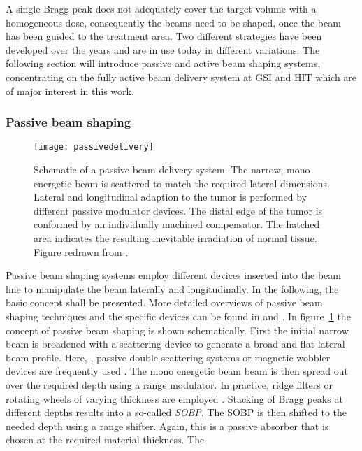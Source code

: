 A single Bragg peak does not adequately cover the target volume with a
homogeneous dose, consequently the beams need to be shaped, once the
beam has been guided to the treatment area. Two different strategies
have been developed over the years and are in use today in different
variations. The following section will introduce passive and active
beam shaping systems, concentrating on the fully active beam delivery
system at \ac{GSI} and \ac{HIT} which are of major interest in this
work.

\subsubsection{Passive beam shaping}
\label{sec:background:passivedelivery}
%
%
\begin{figure}[tbp]
  \centering
  \texttt{[image: passivedelivery]}
  \caption[Schematic of a passive beam delivery system.]{Schematic of
    a passive beam delivery system. The narrow, mono-energetic beam is
    scattered to match the required lateral dimensions. Lateral and
    longitudinal adaption to the tumor is performed by different
    passive modulator devices. The distal edge of the tumor is
    conformed by an individually machined compensator. The hatched
    area indicates the resulting inevitable irradiation of normal
    tissue. Figure redrawn from \citep{Schardt2010}.}
  \label{fig:background:passive}
\end{figure}
Passive beam shaping systems employ different devices inserted into
the beam line to manipulate the beam laterally and longitudinally. In
the following, the basic concept shall be presented. More detailed
overviews of passive beam shaping techniques and the specific devices
can be found in \citet{Chu1993, Kraft2000} and
\citet{Gottschalk2008}. In figure~\ref{fig:background:passive} the
concept of passive beam shaping is shown schematically. First the
initial narrow beam is broadened with a scattering device to generate
a broad and flat lateral beam profile. Here, \eg, passive double
scattering systems or magnetic wobbler devices are frequently used
\citep{Kraft2000}. The mono energetic beam beam is then spread out
over the required depth using a range modulator. In practice, ridge
filters or rotating wheels of varying thickness are employed
\citep{Chu1993}.  Stacking of Bragg peaks at different depths results
into a so-called \emph{\ac{SOBP}}. The \ac{SOBP} is then shifted to
the needed depth using a range shifter. Again, this is a passive
absorber that is chosen at the required material thickness. The
